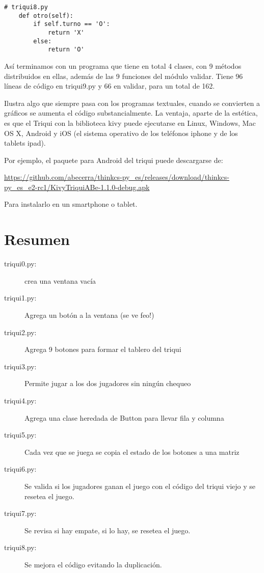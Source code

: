 \begin{lstlisting}
# triqui8.py
    def otro(self):
        if self.turno == 'O':
            return 'X'
        else:
            return 'O'
\end{lstlisting}
Así terminamos con un programa que tiene en total 4 clases, con 9
métodos distribuidos en ellas, además de las 9 funciones del módulo
validar. Tiene 96 líneas de código en triqui9.py y 66 en validar,
para un total de 162.

Ilustra algo que siempre pasa con los programas textuales, cuando
se convierten a gráficos se aumenta el código substancialmente. La
ventaja, aparte de la estética, es que el Triqui con la biblioteca
kivy puede ejecutarse en Linux, Windows, Mac OS X, Android y iOS (el
sistema operativo de los teléfonos iphone y de los tablets ipad).

Por ejemplo, el paquete para Android del triqui puede descargarse
de:

\url{https://github.com/abecerra/thinkcs-py_es/releases/download/thinkcs-py_es_e2-rc1/KivyTriquiABe-1.1.0-debug.apk}

Para instalarlo en un smartphone o tablet.

\section{Resumen}
\begin{description}
\item [{triqui0.py:}] crea una ventana vacía 
\item [{triqui1.py:}] Agrega un botón a la ventana (se ve feo!) 
\item [{triqui2.py:}] Agrega 9 botones para formar el tablero del triqui 
\item [{triqui3.py:}] Permite jugar a los dos jugadores sin ningún chequeo 
\item [{triqui4.py:}] Agrega una clase heredada de Button para llevar fila
y columna 
\item [{triqui5.py:}] Cada vez que se juega se copia el estado de los botones
a una matriz 
\item [{triqui6.py:}] Se valida si los jugadores ganan el juego con el
código del triqui viejo y se resetea el juego. 
\item [{triqui7.py:}] Se revisa si hay empate, si lo hay, se resetea el
juego. 
\item [{triqui8.py:}] Se mejora el código evitando la duplicación. 
\end{description}

